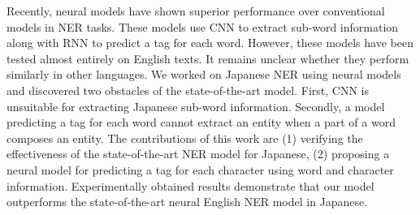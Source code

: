 Recently, neural models have shown superior performance over conventional models in NER tasks. These models use CNN to extract sub-word information along with RNN to predict a tag for each word. However, these models have been tested almost entirely on English texts. It remains unclear whether they perform similarly in other languages. We worked on Japanese NER using neural models and discovered two obstacles of the state-of-the-art model. First, CNN is unsuitable for extracting Japanese sub-word information. Secondly, a model predicting a tag for each word cannot extract an entity when a part of a word composes an entity. The contributions of this work are (1) verifying the effectiveness of the state-of-the-art NER model for Japanese, (2) proposing a neural model for predicting a tag for each character using word and character information. Experimentally obtained results demonstrate that our model outperforms the state-of-the-art neural English NER model in Japanese.
